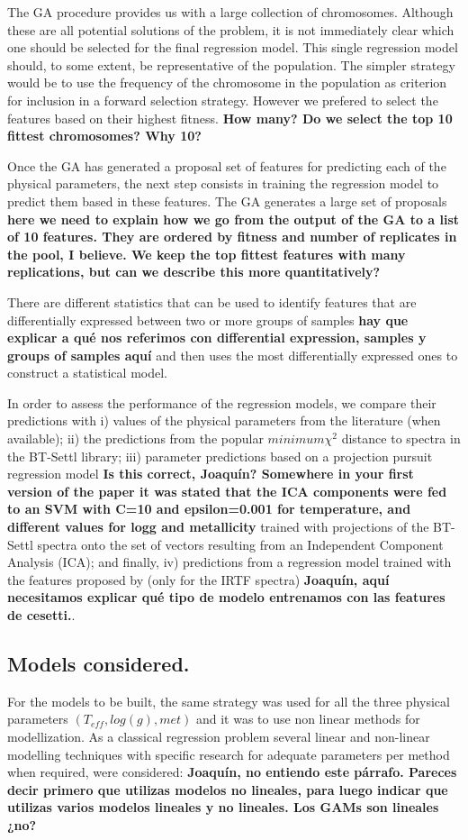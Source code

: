 The GA procedure provides us with a large collection of chromosomes.
Although these are all potential solutions of the problem, it is not
immediately clear which one should be selected for the final
regression model.  This single regression model should, to some
extent, be representative of the population. The simpler strategy
would be to use the frequency of the chromosome in the population as
criterion for inclusion in a forward selection strategy. However we
prefered to select the features based on their highest fitness. {\bf
How many? Do we select the top 10 fittest chromosomes? Why 10?}

Once the GA has generated a proposal set of features for predicting
each of the physical parameters, the next step consists in training
the regression model to predict them based in these features.  The GA
generates a large set of proposals {\bf here we need to explain how we
go from the output of the GA to a list of 10 features. They are
ordered by fitness and number of replicates in the pool, I believe. We
keep the top fittest features with many replications, but can we
describe this more quantitatively?}

There are different statistics that can be used to identify features
that are differentially expressed between two or more groups of
samples {\bf hay que explicar a qué nos referimos con differential
expression, samples y groups of samples aquí} and then uses the most
differentially expressed ones to construct a statistical model.

In order to assess the performance of the regression models, we
compare their predictions with i) values of the physical parameters
from the literature (when available); ii) the predictions from the
popular $minimum \chi^2$ distance to spectra in the BT-Settl library;
iii) parameter predictions based on a projection pursuit regression
model {\bf Is this correct, Joaquín? Somewhere in your first version
of the paper it was stated that the ICA components were fed to an SVM
with C=10 and epsilon=0.001 for temperature, and different values for
logg and metallicity} trained with projections of the BT-Settl spectra
onto the set of vectors resulting from an Independent Component
Analysis (ICA); and finally, iv) predictions from a regression model
trained with the features proposed by \cite{cesetti} (only for the
IRTF spectra) {\bf Joaquín, aquí necesitamos explicar qué tipo de
modelo entrenamos con las features de cesetti.}.

\subsection{Models considered.}
\label {ssub:models}
For the models to be built, the same strategy was used for all the
three physical parameters $(T_{eff}, log(g), met)$ and it was to use
non linear methods for modellization.  As a classical regression
problem several linear and non-linear modelling techniques with
specific research for adequate parameters per method when required,
were considered: {\bf Joaquín, no entiendo este párrafo. Pareces decir
primero que utilizas modelos no lineales, para luego indicar que
utilizas varios modelos lineales y no lineales. Los GAMs son lineales
¿no?}

